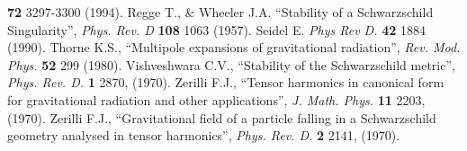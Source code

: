 \documentclass{article}
\begin{document}
\begin{thebibliography}{9}
                        {\bf 72} 
                        3297-3300 
                        (1994).
         Regge T., \& Wheeler J.A. 
                        ``Stability of a Schwarzschild Singularity'', 
                        {\em Phys. Rev. D} 
                        {\bf 108} 
                        1063 
                        (1957).
      Seidel E. 
                        {\em Phys Rev D.} 
                        {\bf 42} 
                        1884 
                        (1990).
      Thorne K.S., 
                        ``Multipole expansions of gravitational radiation'', 
                        {\em Rev. Mod. Phys.} 
                        {\bf 52} 
                        299 
                        (1980).
          Vishveshwara C.V., 
                        ``Stability of the Schwarzschild metric'',
                        {\em Phys. Rev. D.} 
                        {\bf 1} 
                        2870, 
                        (1970).
    Zerilli F.J., 
                        ``Tensor harmonics in canonical form for gravitational 
                          radiation and other applications'', 
                        {\em J. Math. Phys.} 
                        {\bf 11} 
                        2203, 
                        (1970).
     Zerilli F.J., 
                        ``Gravitational field of a particle falling 
                          in a Schwarzschild geometry analysed in 
                          tensor harmonics'',
                        {\em Phys. Rev. D.} 
                        {\bf 2} 
                        2141, 
                        (1970).
\end{thebibliography}

\end{document}
